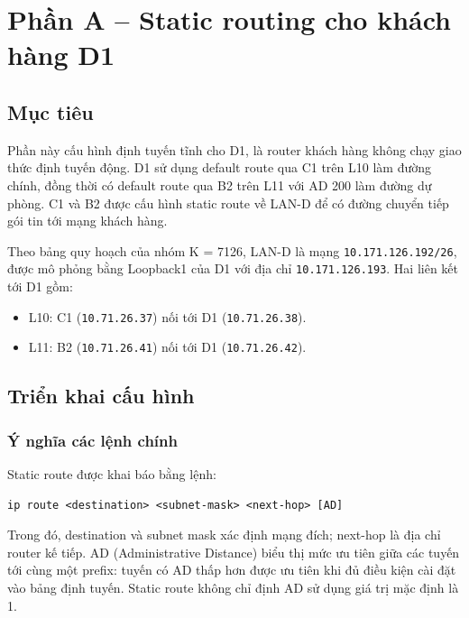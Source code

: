 
\section{Phần A -- Static routing cho khách hàng D1}
\label{sec:partA}

\subsection{Mục tiêu}

Phần này cấu hình định tuyến tĩnh cho D1,
là router khách hàng không chạy giao thức định tuyến động.
D1 sử dụng default route qua C1 trên L10 làm đường chính,
đồng thời có default route qua B2 trên L11 với AD 200
làm đường dự phòng.
C1 và B2 được cấu hình static route về LAN-D
để có đường chuyển tiếp gói tin tới mạng khách hàng.

Theo bảng quy hoạch của nhóm K = 7126,
LAN-D là mạng \texttt{10.171.126.192/26},
được mô phỏng bằng Loopback1 của D1
với địa chỉ \texttt{10.171.126.193}.
Hai liên kết tới D1 gồm:
\begin{itemize}
    \item L10: C1 (\texttt{10.71.26.37})
    nối tới D1 (\texttt{10.71.26.38}).
    \item L11: B2 (\texttt{10.71.26.41})
    nối tới D1 (\texttt{10.71.26.42}).
\end{itemize}

\subsection{Triển khai cấu hình}

\subsubsection{Ý nghĩa các lệnh chính}

Static route được khai báo bằng lệnh:

\begin{lstlisting}
ip route <destination> <subnet-mask> <next-hop> [AD]
\end{lstlisting}

Trong đó, destination và subnet mask xác định mạng đích;
next-hop là địa chỉ router kế tiếp.
AD (Administrative Distance) biểu thị mức ưu tiên
giữa các tuyến tới cùng một prefix: tuyến có AD thấp hơn
được ưu tiên khi đủ điều kiện cài đặt vào bảng định tuyến.
Static route không chỉ định AD sử dụng giá trị mặc định là 1.

